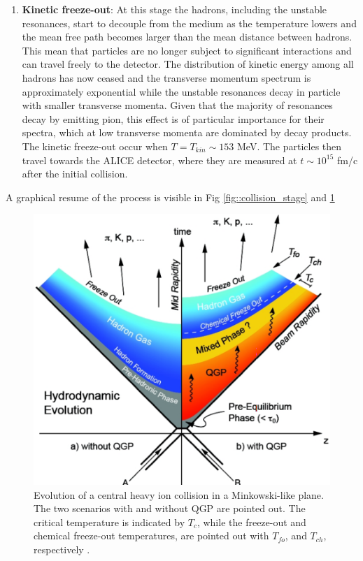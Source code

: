 \documentclass[12pt,a4paper]{book}
\begin{document}
\begin{enumerate}
		\item \textbf{Kinetic freeze-out}: At this stage the hadrons, including the unstable resonances, start to decouple from the medium as the temperature lowers and the mean free path becomes larger than the mean distance between hadrons. This mean that particles are no longer subject to significant interactions and can travel freely to the detector. The distribution of kinetic energy among all hadrons has now ceased and the transverse momentum spectrum is approximately exponential while the unstable resonances decay in particle with smaller transverse momenta. Given that the majority of resonances decay by emitting  pion, this effect is of particular importance for their spectra, which at low transverse momenta are dominated by decay products. The kinetic freeze-out occur when $T= T_{kin} \sim 153$ MeV. The particles then travel towards the ALICE detector, where they are measured at $t \sim 10^{15}$ fm/c after the initial collision.
	\end{enumerate}
	A graphical resume of the process is visible in Fig \ref{fig::collision_stage} and \ref{fig:collision_stage_mikowsky}
	\begin{figure}[ht]
		\centering
		\includegraphics[width=0.6\linewidth]{pictures/collision_stage_mikowsky.png}
		\caption{Evolution of a central heavy ion collision in a Minkowski-like plane. The two scenarios with and without QGP are pointed out. The critical temperature is indicated by $T_c$, while the freeze-out and chemical freeze-out temperatures, are pointed out with $T_{fo}$, and $T_{ch}$, respectively \cite{EvolutionofcollisionsandQGP}.}
		\label{fig:collision_stage_mikowsky} 
	\end{figure}
	
\end{document}
